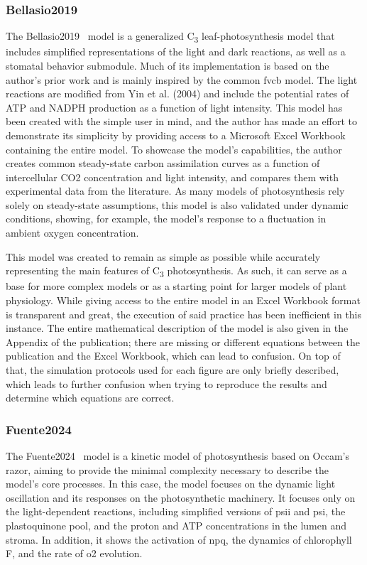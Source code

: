 \subsubsection{Bellasio2019}
The Bellasio2019~\cite{bellasioGeneralisedDynamicModel2019} model is a generalized C\textsubscript{3} leaf-photosynthesis model that includes simplified representations of the light and dark reactions, as well as a stomatal behavior submodule. Much of its implementation is based on the author's prior work and is mainly inspired by the common \gls{fvcb} model. The light reactions are modified from Yin et al. (2004) and include the potential rates of ATP and NADPH production as a function of light intensity. This model has been created with the simple user in mind, and the author has made an effort to demonstrate its simplicity by providing access to a Microsoft Excel Workbook containing the entire model. To showcase the model's capabilities, the author creates common steady-state carbon assimilation curves as a function of intercellular CO2 concentration and light intensity, and compares them with experimental data from the literature. As many models of photosynthesis rely solely on steady-state assumptions, this model is also validated under dynamic conditions, showing, for example, the model's response to a fluctuation in ambient oxygen concentration.

This model was created to remain as simple as possible while accurately representing the main features of C\textsubscript{3} photosynthesis. As such, it can serve as a base for more complex models or as a starting point for larger models of plant physiology. While giving access to the entire model in an Excel Workbook format is transparent and great, the execution of said practice has been inefficient in this instance. The entire mathematical description of the model is also given in the Appendix of the publication; there are missing or different equations between the publication and the Excel Workbook, which can lead to confusion. On top of that, the simulation protocols used for each figure are only briefly described, which leads to further confusion when trying to reproduce the results and determine which equations are correct.

\subsubsection{Fuente2024}
The Fuente2024~\cite{fuenteMathematicalModelSimulate2024} model is a kinetic model of photosynthesis based on Occam's razor, aiming to provide the minimal complexity necessary to describe the model's core processes. In this case, the model focuses on the dynamic light oscillation and its responses on the photosynthetic machinery. It focuses only on the light-dependent reactions, including simplified versions of \gls{psii} and \gls{psi}, the plastoquinone pool, and the proton and ATP concentrations in the lumen and stroma. In addition, it shows the activation of \gls{npq}, the dynamics of chlorophyll \gls{F}, and the rate of \gls{o2} evolution.
                     

